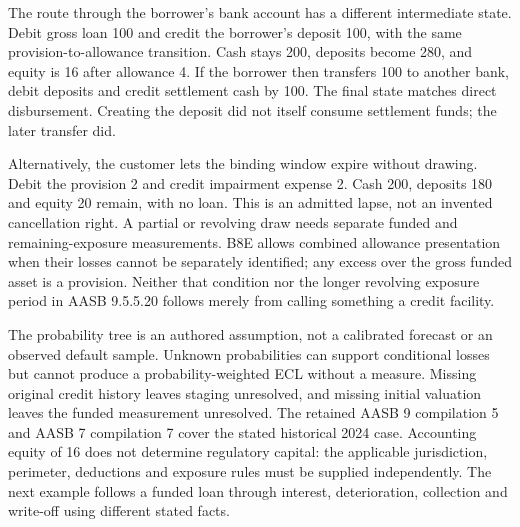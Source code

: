 The route through the borrower's bank account has a different intermediate
state. Debit gross loan 100 and credit the borrower's deposit 100, with the
same provision-to-allowance transition. Cash stays 200, deposits become 280,
and equity is 16 after allowance 4. If the borrower then transfers 100 to
another bank, debit deposits and credit settlement cash by 100. The final
state matches direct disbursement. Creating the deposit did not itself
consume settlement funds; the later transfer did.

Alternatively, the customer lets the binding window expire without drawing.
Debit the provision 2 and credit impairment expense 2. Cash 200, deposits
180 and equity 20 remain, with no loan. This is an admitted lapse, not an
invented cancellation right. A partial or revolving draw needs separate
funded and remaining-exposure measurements. B8E allows combined allowance
presentation when their losses cannot be separately identified; any excess
over the gross funded asset is a provision. Neither that condition nor the
longer revolving exposure period in AASB 9.5.5.20 follows merely from calling
something a credit facility.

The probability tree is an authored assumption, not a calibrated forecast or
an observed default sample. Unknown probabilities can support conditional
losses but cannot produce a probability-weighted ECL without a measure.
Missing original credit history leaves staging unresolved, and missing
initial valuation leaves the funded measurement unresolved. The retained
AASB 9 compilation 5 and AASB 7 compilation 7 cover the stated historical
2024 case. Accounting equity of 16 does not determine regulatory capital:
the applicable jurisdiction, perimeter, deductions and exposure rules must
be supplied independently. The next example follows a funded loan through
interest, deterioration, collection and write-off using different stated facts.
